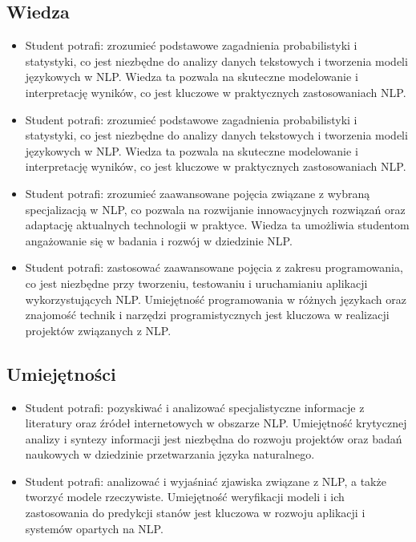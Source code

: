 \documentclass[12pt, a4paper]{article}
\begin{document}
\subsection*{Wiedza}
\begin{itemize}
  \item Student potrafi: zrozumieć podstawowe zagadnienia probabilistyki i statystyki, co jest niezbędne do analizy danych tekstowych i tworzenia modeli językowych w NLP. Wiedza ta pozwala na skuteczne modelowanie i interpretację wyników, co jest kluczowe w praktycznych zastosowaniach NLP.
  \item Student potrafi: zrozumieć podstawowe zagadnienia probabilistyki i statystyki, co jest niezbędne do analizy danych tekstowych i tworzenia modeli językowych w NLP. Wiedza ta pozwala na skuteczne modelowanie i interpretację wyników, co jest kluczowe w praktycznych zastosowaniach NLP.
  \item Student potrafi: zrozumieć zaawansowane pojęcia związane z wybraną specjalizacją w NLP, co pozwala na rozwijanie innowacyjnych rozwiązań oraz adaptację aktualnych technologii w praktyce. Wiedza ta umożliwia studentom angażowanie się w badania i rozwój w dziedzinie NLP.
  \item Student potrafi: zastosować zaawansowane pojęcia z zakresu programowania, co jest niezbędne przy tworzeniu, testowaniu i uruchamianiu aplikacji wykorzystujących NLP. Umiejętność programowania w różnych językach oraz znajomość technik i narzędzi programistycznych jest kluczowa w realizacji projektów związanych z NLP.
\end{itemize}

\subsection*{Umiejętności}
\begin{itemize}
  \item Student potrafi: pozyskiwać i analizować specjalistyczne informacje z literatury oraz źródeł internetowych w obszarze NLP. Umiejętność krytycznej analizy i syntezy informacji jest niezbędna do rozwoju projektów oraz badań naukowych w dziedzinie przetwarzania języka naturalnego.
  \item Student potrafi: analizować i wyjaśniać zjawiska związane z NLP, a także tworzyć modele rzeczywiste. Umiejętność weryfikacji modeli i ich zastosowania do predykcji stanów jest kluczowa w rozwoju aplikacji i systemów opartych na NLP.
\end{itemize}
\end{document}
